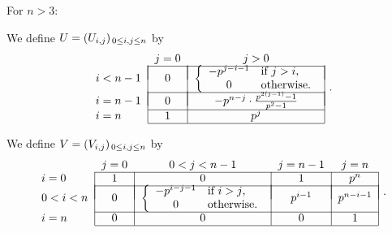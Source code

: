 \documentclass[a4paper,11pt]{amsart}
\begin{document}
For $n>3$:

\vspace{2pt}\quad We define $U=(U_{i,j})_{\hspace{1.3pt}0\leq i,j\leq n}$ %
by
\begin{equation}\begin{tabular}{ l|c|c| }
\multicolumn{1}{r}{}
 &  \multicolumn{1}{c}{$j=0$}
 & \multicolumn{1}{c}{$j>0$}\\
\cline{2-3}
\vspace*{-.45cm}
&&\\
$i<n-1$ & 0 & $\left\{\begin{array}{cl}
-p^{j-i-1}&\text{if  $j>i$,}\\  
0&\text{otherwise.}    
      \end{array}\right.$\\
\cline{2-3}
\vspace*{-.45cm}
&&\\
$i=n-1$ & 0 & $-p^{n-j}\cdot\frac{p^{2(j-1)}-1}{p^2-1}$ \\
\cline{2-3}
$i=n$ &1 & $p^j$\\
\cline{2-3}
\end{tabular}\hspace{4pt}. %
\label{u}\end{equation}

\vspace{.5cm}\quad We define $V=(V_{i,j})_{\hspace{1.3pt}0\leq i,j\leq n}$ %
by 
\begin{equation}\begin{tabular}{ l|c|c|c|c| }
\multicolumn{1}{r}{}
 & \multicolumn{1}{c}{$j=0$}
 &  \multicolumn{1}{c}{$0<j<n-1$}
 & \multicolumn{1}{c}{$j=n-1$} 
 & \multicolumn{1}{c}{$j=n$}\\
\cline{2-5}
$i=0$&1 &0&1&$p^n$\\
\cline{2-5}
\vspace*{-.45cm}
&&&&\\
$0<i<n$ & 0& $\left\{\begin{array}{cl}
-p^{i-j-1}&\text{if  $i>j$,}\\  
0&\text{otherwise.}    
      \end{array}\right.$&$p^{i-1}$&$p^{n-i-1}$\\
\cline{2-5}
$i=n$ &0 & $0$&0&1\\
\cline{2-5}
\end{tabular}\hspace{4pt}. %
\label{v}\end{equation}
\end{document}
